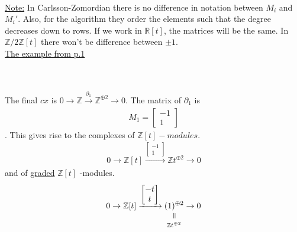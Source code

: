 \documentclass[11pt,a4paper]{report}
\newcommand{\verteq}{\rotatebox{90}{$\,=$}}
\newcommand{\equalto}[2]{\underset{\scriptstyle\overset{\mkern4mu\verteq}{#2}}{#1}}
\begin{document}
              \\
              \underline{Note:} In Carlsson-Zomordian there is no difference in notation between $M_i$ and $M_i'$. Also, for the algorithm they order the elements such that the degree decreases down to rows. If we work in $\mathbb{R}[t]$, the matrices will be the same. In $\mathbb{Z}/2\mathbb{Z}[t]$ there won't be difference between $\pm 1$.\\
              \underline{The example from p.1}\\
              \\
              \\
              The final $cx$ is $0 \rightarrow \mathbb{Z} \xrightarrow{\partial_1} \mathbb{Z}^{\oplus2} \rightarrow 0$. The matrix of $\partial_1$ is \begin{align*}M_1 = \begin{bmatrix}-1\\1\end{bmatrix}\end{align*}. This gives rise to the complexes of $\mathbb{Z}[t] - modules$.\\
              \begin{align*}
                0 \rightarrow \mathbb{Z}[t] \xrightarrow{\begin{bmatrix}-1\\1\end{bmatrix}} \mathbb{Z}t^{\oplus2} \rightarrow 0
              \end{align*}
              and of \underline{graded} $\mathbb{Z}[t]$ -modules.
              \begin{align*}
                0 \rightarrow \mathbb{Z}[t] \xrightarrow{\begin{bmatrix}-t\\t\end{bmatrix}} \equalto{(1)^{\oplus2}}{\mathbb{Z}t^{\oplus2}} \rightarrow 0
              \end{align*} 




 


 
 
\end{document}
